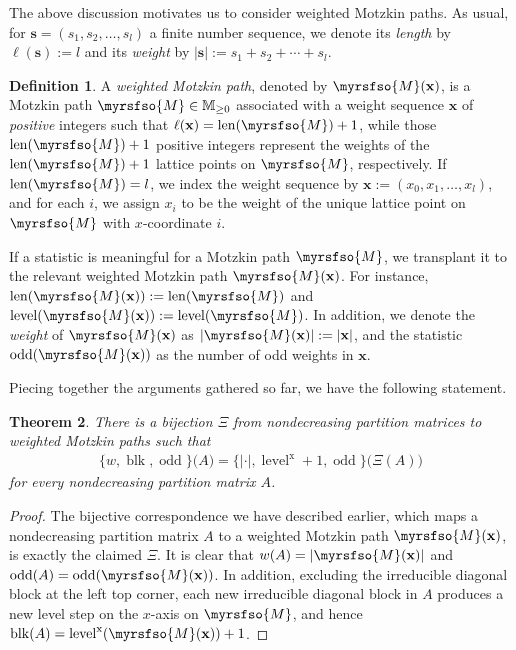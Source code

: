 \documentclass[12pt,reqno]{amsart}
\numberwithin{equation}{section}
\theoremstyle{theorem}
\newtheorem{theorem}{Theorem}[section]
\theoremstyle{definition}
\newtheorem{definition}[theorem]{Definition}
\theoremstyle{named}
\newcommand{\odd}{\operatorname{odd}}
\newcommand{\blk}{\operatorname{blk}}
\newcommand{\len}{\operatorname{len}}
\newcommand{\level}{\operatorname{level}}
\newcommand{\x}{\operatorname{x}}
\newcommand{\cM}{\myrsfso{M}}
\newcommand{\bbM}{\mathbb{M}}
\newcommand{\bfx}{\mathbf{x}}
\begin{document}
The above discussion motivates us to consider weighted Motzkin paths. As usual, for $\mathbf{s} = (s_1,s_2,\ldots,s_l)$ a finite number sequence, we denote its \emph{length} by $\ell(\mathbf{s}) := l$ and its \emph{weight} by $|\mathbf{s}|:=s_1+s_2+\cdots+s_l$.

\begin{definition}\label{def:weighted-M-path}
	A \emph{weighted Motzkin path}, denoted by $\cM(\bfx)$, is a Motzkin path $\cM\in \bbM_{\ge 0}$ associated with a weight sequence $\bfx$ of \emph{positive} integers such that $\ell(\bfx) = \len(\cM)+1$, while those $\len(\cM)+1$ positive integers represent the weights of the $\len(\cM)+1$ lattice points on $\cM$, respectively. If $\len(\cM) = l$, we index the weight sequence by $\bfx := (x_0,x_1,\ldots,x_l)$, and for each $i$, we assign $x_i$ to be the weight of the unique lattice point on $\cM$ with $x$-coordinate $i$.
\end{definition}

If a statistic is meaningful for a Motzkin path $\cM$, we transplant it to the relevant weighted Motzkin path $\cM(\bfx)$. For instance, $\len(\cM(\bfx)) := \len(\cM)$ and $\level(\cM(\bfx)) := \level(\cM)$. In addition, we denote the \emph{weight} of $\cM(\bfx)$ as $|\cM(\bfx)| := |\bfx|$, and the statistic $\odd(\cM(\bfx))$ as the number of odd weights in $\bfx$.

Piecing together the arguments gathered so far, we have the following statement.

\begin{theorem}\label{th:Xi}
	There is a bijection $\Xi$ from nondecreasing partition matrices to weighted Motzkin paths such that
	\begin{align}
		\{w,\blk,\odd\}\big(A\big) = \{|\cdot|,\level^{\x}+1,\odd\}\big(\Xi(A)\big)
	\end{align}
	for every nondecreasing partition matrix $A$.
\end{theorem}

\begin{proof}
	The bijective correspondence we have described earlier, which maps a nondecreasing partition matrix $A$ to a weighted Motzkin path $\cM(\bfx)$, is exactly the claimed $\Xi$. It is clear that $w(A) = |\cM(\bfx)|$ and $\odd(A) = \odd(\cM(\bfx))$. In addition, excluding the irreducible diagonal block at the left top corner, each new irreducible diagonal block in $A$ produces a new level step on the $x$-axis on $\cM$, and hence $\blk(A) = \level^{\x}(\cM(\bfx)) + 1$.
\end{proof}
\end{document}

